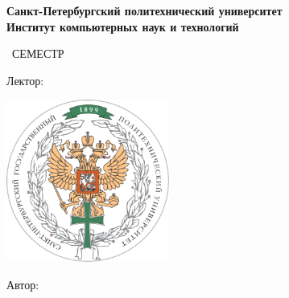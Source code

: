 
\begin{titlepage}
	\clearpage\thispagestyle{empty}
	\centering
	
	\textbf{Санкт-Петербургский политехнический университет\\Институт компьютерных
	наук и технологий}
	\vspace{33ex}
	
	{\textbf{\FullCourseNameFirstPart}}
	
	\SemesterNumber\ СЕМЕСТР  
	\vspace{1ex}
	
	Лектор: \textit{\LecturerInitials}
	
	\includegraphics[width=0.4\textwidth]{image/poly_logo.png}

	\begin{flushright}
		\noindent
		Автор: \textit{\AuthorInitials}
		\\
	\end{flushright}
	
	\vfill
	\CourseDate
	\pagebreak
\end{titlepage}
